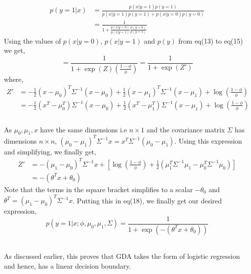 \documentclass[12pt]{article}
\begin{document}
\begin{flushleft}
\begin{equation}
\begin{aligned}
p(y=1|x)&=\frac{p(x|y=1)p(y=1)}{p(x|y=1)p(y=1)+p(x|y=0)p(y=0)}\\
       &=\frac{1}{1+\frac{p(x|y=0)}{p(x|y=1)}\frac{p(y=0)}{p(y=1)}}
\end{aligned}
\end{equation}
Using the values of $p(x|y=0)$, $p(x|y=1)$ and $p(y)$ from eq(13) to eq(15) we get,
\begin{equation}
    =\frac{1}{1+\exp{(Z)}(\frac{1-\phi}{\phi})}=\frac{1}{1+\exp{(Z')}}
\end{equation}
where, 
\begin{equation}
\begin{aligned}
    Z'&=-\frac{1}{2}(x-\mu_0)^T \Sigma^{-1}(x-\mu_0)+\frac{1}{2}(x-\mu_1)^T \Sigma^{-1}(x-\mu_1)+\log(\frac{1-\phi}{\phi})\\
    &=-\frac{1}{2}(x^T-\mu_0^T) \Sigma^{-1}(x-\mu_0)+\frac{1}{2}(x^T-\mu_1^T) \Sigma^{-1}(x-\mu_1)+\log(\frac{1-\phi}{\phi})\\
\end{aligned}
\end{equation}\\
\vspace{6mm}
As $\mu_0, \mu_1, x$ have the same dimensions i.e $n \times 1$ and the covariance matrix $\Sigma$ has dimensions $n\times n$, $(\mu_0-\mu_1)^T\Sigma^{-1}x=x^T\Sigma^{-1}(\mu_0-\mu_1)$. Using this expression and simplifying, we finally get,
\begin{equation}
\begin{aligned}
Z'&=-(\mu_1-\mu_0)^T\Sigma^{-1}x+[\log(\frac{1-\phi}{\phi})+\frac{1}{2}(\mu_1^T\Sigma^{-1}\mu_1-\mu_0^T\Sigma^{-1}\mu_0)]\\
&=-(\theta^Tx+\theta_0)
\end{aligned}
\end{equation}
Note that the terms in the square bracket simplifies to a scalar $-\theta_0$ and $\theta^T=(\mu_1-\mu_0)^T\Sigma^{-1}x$. Putting this in eq(18), we finally get our desired expression,
\begin{equation}
    p(y=1|x;\phi,\mu_0,\mu_1,\Sigma)=\frac{1}{1+\exp{(-(\theta^Tx+\theta_0))}}
\end{equation}\\
\vspace{8mm}
\end{flushleft}
As discussed earlier, this proves that GDA takes the form of logistic regression and hence, has a linear decision boundary.
\end{document}
